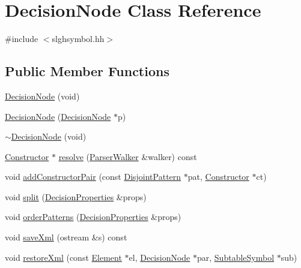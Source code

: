 \hypertarget{class_decision_node}{}\section{Decision\+Node Class Reference}
\label{class_decision_node}


{\ttfamily \#include $<$slghsymbol.\+hh$>$}

\subsection*{Public Member Functions}
\begin{DoxyCompactItemize}
\item 
\mbox{\hyperlink{class_decision_node_a57d0d4384297f9889bf2b72301a19b34}{Decision\+Node}} (void)
\item 
\mbox{\hyperlink{class_decision_node_af5e60d0f279625b461b1af4080c249b7}{Decision\+Node}} (\mbox{\hyperlink{class_decision_node}{Decision\+Node}} $\ast$p)
\item 
\mbox{\hyperlink{class_decision_node_aa7684f142c16b051487def61db596557}{$\sim$\+Decision\+Node}} (void)
\item 
\mbox{\hyperlink{class_constructor}{Constructor}} $\ast$ \mbox{\hyperlink{class_decision_node_af8bd0d3c14c10f9b43881f1ef493f95a}{resolve}} (\mbox{\hyperlink{class_parser_walker}{Parser\+Walker}} \&walker) const
\item 
void \mbox{\hyperlink{class_decision_node_a4bd3c547bf2c93c4b8fcde113bb52884}{add\+Constructor\+Pair}} (const \mbox{\hyperlink{class_disjoint_pattern}{Disjoint\+Pattern}} $\ast$pat, \mbox{\hyperlink{class_constructor}{Constructor}} $\ast$ct)
\item 
void \mbox{\hyperlink{class_decision_node_a9e5138d4016a89ea1f33db170a1b8b93}{split}} (\mbox{\hyperlink{class_decision_properties}{Decision\+Properties}} \&props)
\item 
void \mbox{\hyperlink{class_decision_node_aa1e03428a03681b6a89d812ec4f7346d}{order\+Patterns}} (\mbox{\hyperlink{class_decision_properties}{Decision\+Properties}} \&props)
\item 
void \mbox{\hyperlink{class_decision_node_a2c1fb2500eafcafeb80c29bd44450c09}{save\+Xml}} (ostream \&s) const
\item 
void \mbox{\hyperlink{class_decision_node_a6b8d14fdf942a38107cb1633f5065202}{restore\+Xml}} (const \mbox{\hyperlink{class_element}{Element}} $\ast$el, \mbox{\hyperlink{class_decision_node}{Decision\+Node}} $\ast$par, \mbox{\hyperlink{class_subtable_symbol}{Subtable\+Symbol}} $\ast$sub)
\end{DoxyCompactItemize}


